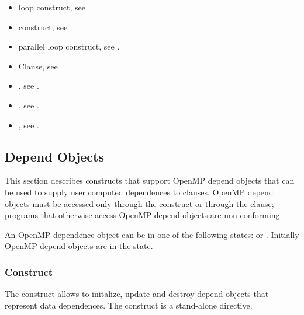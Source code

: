 \crossreferences
\begin{itemize}
\item loop construct, see
.

\item {} construct, see
.

\item parallel loop construct, see
.

\item {} Clause, see

\item {}, see
.

\item {}, see
.

\item {}, see
.

\end{itemize}

\subsection{Depend Objects}
\label{subsec:Depend Object}

This section describes constructs that support OpenMP depend objects that can be used to supply user computed dependences to  clauses. OpenMP depend objects must be accessed only through the  construct or through the  clause; programs that otherwise access OpenMP depend objects are non-conforming.

An OpenMP dependence object can be in one of the following states:  or . Initially OpenMP depend objects are in the  state.

\subsubsection{ Construct}
\label{subsubsec:depobj Construct}
\summary
The  construct allows to initalize, update and destroy depend objects that represent data dependences. The  construct is a stand-alone directive.

